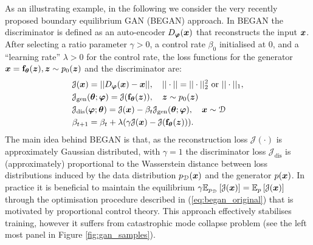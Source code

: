 As an illustrating example, in the following we consider the very recently proposed boundary equilibrium GAN (BEGAN) \citep{berthelot:began2017} approach. In BEGAN the discriminator is defined as an auto-encoder $D_{\bm{\varphi}}(\bm{x})$ that reconstructs the input $\bm{x}$. After selecting a ratio parameter $\gamma > 0$, a control rate $\beta_0$ initialised at 0, and a ``learning rate'' $\lambda > 0$ for the control rate, the loss functions for the generator $\bm{x} = \mathbf{f}_{\bm{\theta}}(\bm{z}), \bm{z} \sim p_0(\bm{z})$ and the discriminator are:
\begin{equation}
\begin{aligned}
& \mathcal{J}(\bm{x}) =  || D_{\bm{\varphi}}(\bm{x}) - \bm{x} ||, \quad || \cdot || = || \cdot ||_2^2 \text{ or } || \cdot ||_1, \\
& \mathcal{J}_{\text{gen}}(\bm{\theta}; \bm{\varphi}) = \mathcal{J}(\mathbf{f}_{\bm{\theta}}(\bm{z})), \quad \bm{z} \sim p_0(\bm{z})  \\ 
& \mathcal{J}_{\text{dis}}(\bm{\varphi}; \bm{\theta}) = \mathcal{J}(\bm{x}) - \beta_t \mathcal{J}_{\text{gen}}(\bm{\theta}; \bm{\varphi}), \quad \bm{x} \sim \mathcal{D} \\
& \beta_{t+1} = \beta_t + \lambda (\gamma \mathcal{J}(\bm{x}) - \mathcal{J}(\mathbf{f}_{\bm{\theta}}(\bm{z}))).
\end{aligned}
\label{eq:began_original}
\end{equation}
The main idea behind BEGAN is that, as the reconstruction loss $\mathcal{J}(\cdot)$ is approximately Gaussian distributed, with $\gamma = 1$ the discriminator loss $\mathcal{J}_{\text{dis}}$ is (approximately) proportional to the Wasserstein distance between loss distributions induced by the data distribution $p_{\mathcal{D}}(\bm{x})$ and the generator $p(\bm{x})$. In practice it is beneficial to maintain the equilibrium $\gamma \mathbb{E}_{p_{\mathcal{D}}} \left[ \mathcal{J}(\bm{x}) \right] = \mathbb{E}_{p} \left[ \mathcal{J}(\bm{x}) \right] $ through the optimisation procedure described in (\ref{eq:began_original}) that is motivated by proportional control theory. This approach effectively stabilises training, however it suffers from catastrophic mode collapse problem (see the left most panel in Figure \ref{fig:gan_samples}). 

